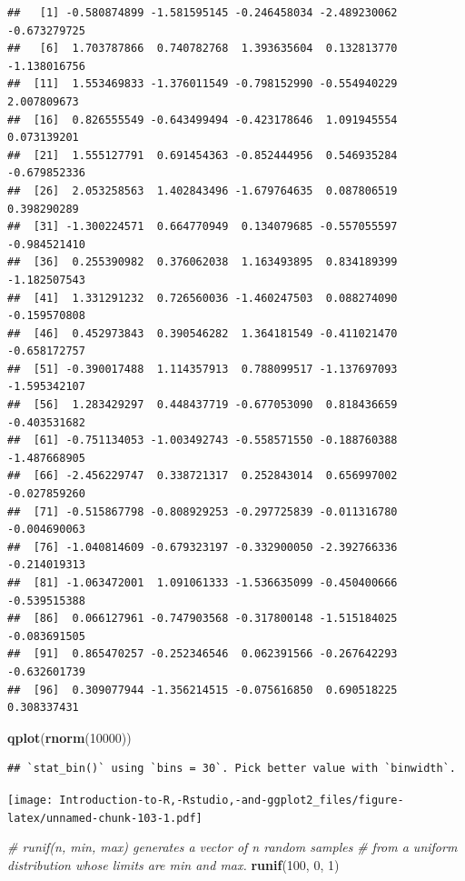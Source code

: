 \documentclass[]{book}
\newenvironment{Shaded}{\begin{snugshade}}{\end{snugshade}}
\newcommand{\CommentTok}[1]{\textcolor[rgb]{0.56,0.35,0.01}{\textit{#1}}}
\newcommand{\DecValTok}[1]{\textcolor[rgb]{0.00,0.00,0.81}{#1}}
\newcommand{\KeywordTok}[1]{\textcolor[rgb]{0.13,0.29,0.53}{\textbf{#1}}}
\newcommand{\NormalTok}[1]{#1}
\begin{document}
\begin{verbatim}
##   [1] -0.580874899 -1.581595145 -0.246458034 -2.489230062 -0.673279725
##   [6]  1.703787866  0.740782768  1.393635604  0.132813770 -1.138016756
##  [11]  1.553469833 -1.376011549 -0.798152990 -0.554940229  2.007809673
##  [16]  0.826555549 -0.643499494 -0.423178646  1.091945554  0.073139201
##  [21]  1.555127791  0.691454363 -0.852444956  0.546935284 -0.679852336
##  [26]  2.053258563  1.402843496 -1.679764635  0.087806519  0.398290289
##  [31] -1.300224571  0.664770949  0.134079685 -0.557055597 -0.984521410
##  [36]  0.255390982  0.376062038  1.163493895  0.834189399 -1.182507543
##  [41]  1.331291232  0.726560036 -1.460247503  0.088274090 -0.159570808
##  [46]  0.452973843  0.390546282  1.364181549 -0.411021470 -0.658172757
##  [51] -0.390017488  1.114357913  0.788099517 -1.137697093 -1.595342107
##  [56]  1.283429297  0.448437719 -0.677053090  0.818436659 -0.403531682
##  [61] -0.751134053 -1.003492743 -0.558571550 -0.188760388 -1.487668905
##  [66] -2.456229747  0.338721317  0.252843014  0.656997002 -0.027859260
##  [71] -0.515867798 -0.808929253 -0.297725839 -0.011316780 -0.004690063
##  [76] -1.040814609 -0.679323197 -0.332900050 -2.392766336 -0.214019313
##  [81] -1.063472001  1.091061333 -1.536635099 -0.450400666 -0.539515388
##  [86]  0.066127961 -0.747903568 -0.317800148 -1.515184025 -0.083691505
##  [91]  0.865470257 -0.252346546  0.062391566 -0.267642293 -0.632601739
##  [96]  0.309077944 -1.356214515 -0.075616850  0.690518225  0.308337431
\end{verbatim}

\begin{Shaded}
\begin{Highlighting}[]
\KeywordTok{qplot}\NormalTok{(}\KeywordTok{rnorm}\NormalTok{(}\DecValTok{10000}\NormalTok{))}
\end{Highlighting}
\end{Shaded}

\begin{verbatim}
## `stat_bin()` using `bins = 30`. Pick better value with `binwidth`.
\end{verbatim}

\texttt{[image: Introduction-to-R,-Rstudio,-and-ggplot2\_files/figure-latex/unnamed-chunk-103-1.pdf]}

\begin{Shaded}
\begin{Highlighting}[]
\CommentTok{# runif(n, min, max) generates a vector of n random samples }
\CommentTok{# from a uniform distribution whose limits are min and max. }
\KeywordTok{runif}\NormalTok{(}\DecValTok{100}\NormalTok{, }\DecValTok{0}\NormalTok{, }\DecValTok{1}\NormalTok{)}
\end{Highlighting}
\end{Shaded}
\end{document}
